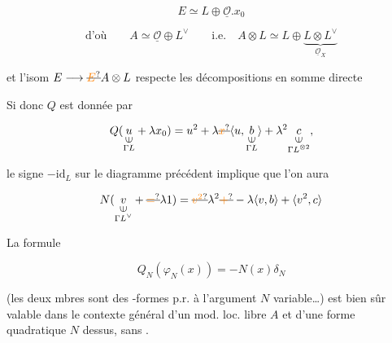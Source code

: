 \[
E\simeq L\oplus\underline{\mathcal O}.x_0
\]

\[
\text{d'où}\qquad A\simeq\underline{\mathcal O}\oplus L^\vee \qquad
\text{i.e.}\quad A\otimes L\simeq L\oplus
\underbrace{L\otimes L^\vee}_{\underline{\mathcal O}_X}
\]



et l'isom $E\longrightarrow\deleted{\unsure{E}}A\otimes L$ respecte les décompositions en somme directe


Si donc $Q$ est donnée par

\[
Q(\underset{\substack{\rotatebox{90}{$\in$}\\\Gamma L}}{u}+\lambda x_0)
=u^2+\lambda\deleted{\unsure{x}}\langle u,\underset{\substack{\rotatebox{90}{$\in$}\\\Gamma L}}{b}\rangle
+\lambda^2\underset{\substack{\rotatebox{90}{$\in$}\\\Gamma L^{\otimes2}}}{c},
\]

le signe $-\mathrm{id}_{L}$ sur le diagramme précédent implique que l'on aura

\[
N(\underset{\substack{\rotatebox{90}{$\in$}\\\Gamma L^\vee}}{v}+\deleted{\unsure{=}}\lambda 1)
=\deleted{\unsure{v^2}}\lambda^2\deleted{\unsure{+}}-\lambda\langle v,b\rangle+\langle v^{2},c\rangle
\]

La formule

\[
\boxed{Q_N(\varphi_N(x))=-N(x)\delta_N}
\]

(les deux mbres sont des -formes p.r. à l'argument $N$ variable\ldots) est bien sûr valable dans le contexte général d'un mod. loc. libre $A$  et d'une forme quadratique  $N$ dessus, sans .



